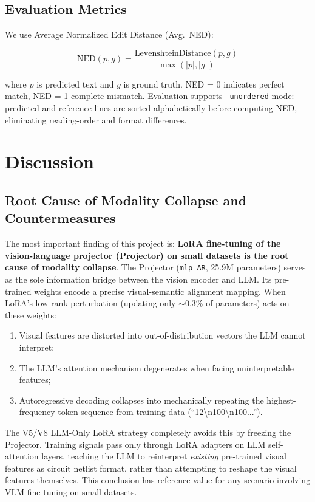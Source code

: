 \subsection{Evaluation Metrics}

We use Average Normalized Edit Distance (Avg.\ NED):

\begin{equation}
\text{NED}(p, g) = \frac{\text{LevenshteinDistance}(p, g)}{\max(|p|, |g|)}
\end{equation}

where $p$ is predicted text and $g$ is ground truth. NED = 0 indicates perfect match, NED = 1 complete mismatch. Evaluation supports \texttt{--unordered} mode: predicted and reference lines are sorted alphabetically before computing NED, eliminating reading-order and format differences.


\section{Discussion}

\subsection{Root Cause of Modality Collapse and Countermeasures}

The most important finding of this project is: \textbf{LoRA fine-tuning of the vision-language projector (Projector) on small datasets is the root cause of modality collapse}. The Projector (\texttt{mlp\_AR}, 25.9M parameters) serves as the sole information bridge between the vision encoder and LLM. Its pre-trained weights encode a precise visual-semantic alignment mapping. When LoRA's low-rank perturbation (updating only $\sim$0.3\% of parameters) acts on these weights:

\begin{enumerate}[nosep]
    \item Visual features are distorted into out-of-distribution vectors the LLM cannot interpret;
    \item The LLM's attention mechanism degenerates when facing uninterpretable features;
    \item Autoregressive decoding collapses into mechanically repeating the highest-frequency token sequence from training data (``12\textbackslash n100\textbackslash n100...'').
\end{enumerate}

The V5/V8 LLM-Only LoRA strategy completely avoids this by freezing the Projector. Training signals pass only through LoRA adapters on LLM self-attention layers, teaching the LLM to reinterpret \emph{existing} pre-trained visual features as circuit netlist format, rather than attempting to reshape the visual features themselves. This conclusion has reference value for any scenario involving VLM fine-tuning on small datasets.


